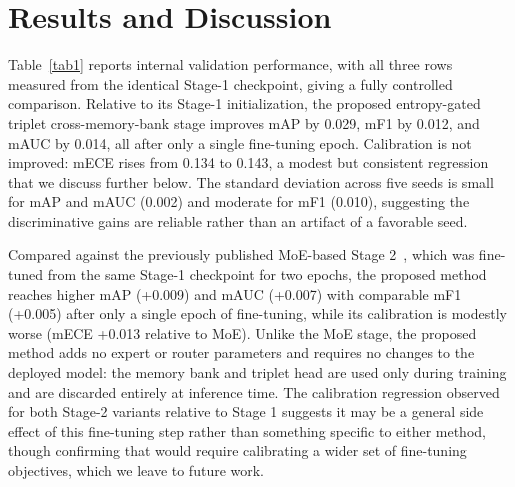 \documentclass[conference]{IEEEtran}
\begin{document}
\section{Results and Discussion}
\label{sec:results}

\begin{table}[htbp]
\caption{Internal validation performance, all three rows sharing the same Stage-1 checkpoint used in our original submission~\cite{b12}. Stage-2 (proposed) is reported as mean $\pm$ sample standard deviation over 5 seeds.}
\begin{center}
\label{tab1}
\end{center}
\end{table}

Table~\ref{tab1} reports internal validation performance, with all three rows measured from the identical Stage-1 checkpoint, giving a fully controlled comparison. Relative to its Stage-1 initialization, the proposed entropy-gated triplet cross-memory-bank stage improves mAP by 0.029, mF1 by 0.012, and mAUC by 0.014, all after only a single fine-tuning epoch. Calibration is not improved: mECE rises from 0.134 to 0.143, a modest but consistent regression that we discuss further below. The standard deviation across five seeds is small for mAP and mAUC (0.002) and moderate for mF1 (0.010), suggesting the discriminative gains are reliable rather than an artifact of a favorable seed.

Compared against the previously published MoE-based Stage 2~\cite{b12}, which was fine-tuned from the same Stage-1 checkpoint for two epochs, the proposed method reaches higher mAP (+0.009) and mAUC (+0.007) with comparable mF1 (+0.005) after only a single epoch of fine-tuning, while its calibration is modestly worse (mECE +0.013 relative to MoE). Unlike the MoE stage, the proposed method adds no expert or router parameters and requires no changes to the deployed model: the memory bank and triplet head are used only during training and are discarded entirely at inference time. The calibration regression observed for both Stage-2 variants relative to Stage 1 suggests it may be a general side effect of this fine-tuning step rather than something specific to either method, though confirming that would require calibrating a wider set of fine-tuning objectives, which we leave to future work.
\end{document}
